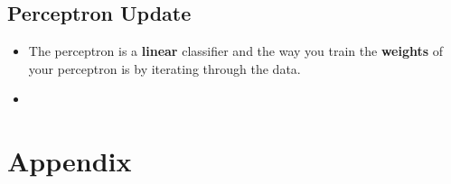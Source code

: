 \documentclass[twocolumn]{article}
\begin{document}
\subsection{Perceptron Update}
\label{sec:perceptron-update}


\begin{itemize}
\item The perceptron is a \textbf{linear} classifier and the way you
  train the \textbf{weights} of your perceptron is by iterating
  through the data.
\item 
\end{itemize}

\onecolumn{}
\section{Appendix}
\label{sec:appendix}
\end{document}
